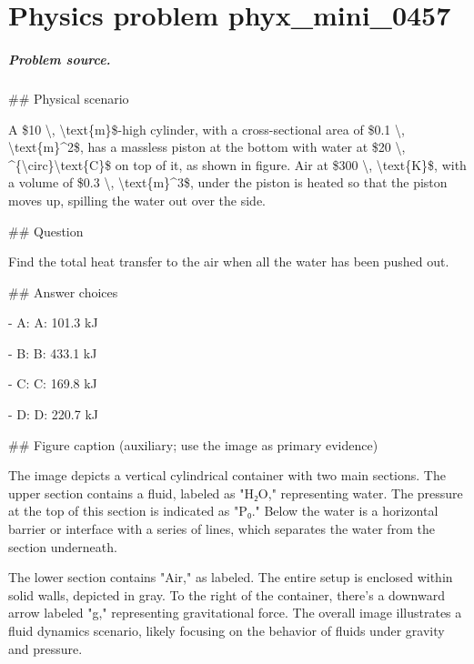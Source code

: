 
\chapter{Physics problem phyx\_mini\_0457}
\label{ch:PhyXMiniProblems_problem_phyx_mini_0457}

\paragraph{Problem source.}
\#\# Physical scenario

A \$10 \textbackslash{}, \textbackslash{}text\{m\}\$-high cylinder, with a cross-sectional area of \$0.1 \textbackslash{}, \textbackslash{}text\{m\}\textasciicircum{}2\$, has a massless piston at the bottom with water at \$20 \textbackslash{}, \textasciicircum{}\{\textbackslash{}circ\}\textbackslash{}text\{C\}\$ on top of it, as shown in figure. Air at \$300 \textbackslash{}, \textbackslash{}text\{K\}\$, with a volume of \$0.3 \textbackslash{}, \textbackslash{}text\{m\}\textasciicircum{}3\$, under the piston is heated so that the piston moves up, spilling the water out over the side.

\#\# Question

Find the total heat transfer to the air when all the water has been pushed out.

\#\# Answer choices

- A: A: 101.3 kJ

- B: B: 433.1 kJ

- C: C: 169.8 kJ

- D: D: 220.7 kJ

\#\# Figure caption (auxiliary; use the image as primary evidence)

The image depicts a vertical cylindrical container with two main sections. The upper section contains a fluid, labeled as "H₂O," representing water. The pressure at the top of this section is indicated as "P₀." Below the water is a horizontal barrier or interface with a series of lines, which separates the water from the section underneath.

The lower section contains "Air," as labeled. The entire setup is enclosed within solid walls, depicted in gray. To the right of the container, there's a downward arrow labeled "g," representing gravitational force. The overall image illustrates a fluid dynamics scenario, likely focusing on the behavior of fluids under gravity and pressure.

